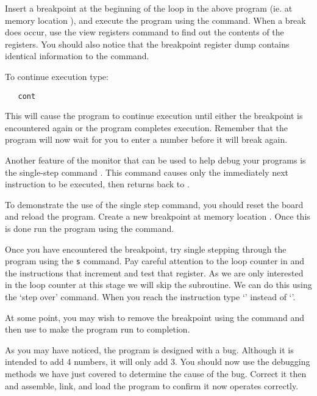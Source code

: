 Insert a breakpoint at the beginning of the loop in the above program 
(ie. at memory location ), and execute the program using
the  command.
When a break does occur, use the view registers command to find out 
the contents of the registers. You should also notice that the breakpoint 
register dump contains identical information to the  command.

To continue execution type:
\begin{verbatim}
   cont
\end{verbatim}
This will cause the program to continue execution until either the
breakpoint is encountered again or the program completes execution.
Remember that the program will now wait for you to enter a number
before it will break again.

Another feature of the monitor that can be used to help debug your programs
is the single-step command . This command causes only the
immediately next instruction to be executed, then returns back to
\WRAMPmon.

To demonstrate the use of the single step command, you should reset the
board and reload the program. Create a new breakpoint at memory location
. Once this is done run the program using the 
command.

Once you have encountered the breakpoint, try single stepping through
the program using the \verb|s| command. Pay careful attention to the
loop counter in  and the instructions that increment and test
that register. As we are only interested in the loop counter at this
stage we will skip the  subroutine. We can do this using
the `step over'  command. When you reach the instruction  type `' instead of `'.

At some point, you may wish to remove the breakpoint using the
 command and then use  to make the program run to
completion.

As you may have noticed, the program is designed with a bug. Although
it is intended to add 4 numbers, it will only add 3. You should now use
the debugging methods we have just covered to determine the cause of the
bug. Correct it then and assemble, link, and load the program to confirm
it now operates correctly.
